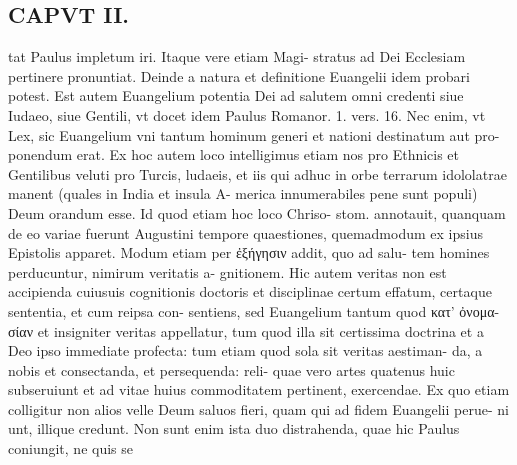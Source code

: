 \documentclass{article}
\begin{document}
\begin{pages}
\section*{CAPVT  II. }
\marginpar{[ p.53 ]}\pstart tat Paulus impletum iri. Itaque vere etiam Magi- stratus ad Dei Ecclesiam pertinere pronuntiat. Deinde a natura et definitione Euangelii idem probari potest. Est autem Euangelium potentia Dei ad salutem omni credenti siue Iudaeo, siue Gentili, vt docet idem Paulus Romanor. 1. vers. 16. Nec enim, vt Lex, sic Euangelium vni tantum hominum generi et nationi destinatum aut pro- ponendum erat. Ex hoc autem loco intelligimus etiam nos pro Ethnicis et Gentilibus veluti pro Turcis, ludaeis, et iis qui adhuc in orbe terrarum idololatrae manent (quales in India et insula A- merica innumerabiles pene sunt populi) Deum orandum esse. Id quod etiam hoc loco Chriso- stom. annotauit, quanquam de eo variae fuerunt Augustini tempore quaestiones, quemadmodum ex ipsius Epistolis apparet. Modum etiam per ἐξήγησιν addit, quo ad salu- tem homines perducuntur, nimirum veritatis a- gnitionem. Hic autem veritas non est accipienda cuiusuis cognitionis doctoris et disciplinae certum effatum, certaque sententia, et cum reipsa con- sentiens, sed Euangelium tantum quod κατ' ὀνομα- σίαν et insigniter veritas appellatur, tum quod illa sit certissima doctrina et a Deo ipso immediate profecta: tum etiam quod sola sit veritas aestiman- da, a nobis et consectanda, et persequenda: reli- quae vero artes quatenus huic subseruiunt et ad vitae huius commoditatem pertinent, exercendae. Ex quo etiam colligitur non alios velle Deum saluos fieri, quam qui ad fidem Euangelii perue- ni unt, illique credunt. Non sunt enim ista duo distrahenda, quae hic Paulus coniungit, ne quis se  \pend

\end{pages}
\end{document}
